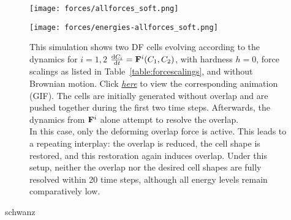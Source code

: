 \begin{figure}[htbp]
	\centering
	\texttt{[image: forces/allforces\_soft.png]}\\[1ex]
	\begin{minipage}[c]{0.35\textwidth}
		\texttt{[image: forces/energies-allforces\_soft.png]}
	\end{minipage}\hfill
	\begin{minipage}[c]{0.6\textwidth}
		\caption{
			This simulation shows two DF cells evolving according to the dynamics for $i=1,2$ $\frac{\mathrm{d} C_i}{\mathrm{d} t} = \mathbf{F}^i(C_1, C_2)$, with hardness $h=0$, force scalings as listed in Table~\ref{table:forcescalings}, and without Brownian motion.
			Click \href{https://github.com/tivo476c/FlexibleCellModel/blob/master/figures/gifs/showForces/show-allForces-soft.gif}{\textit{here}} to view the corresponding animation (GIF).
			The cells are initially generated without overlap and are pushed together during the first two time steps. Afterwards, the dynamics from $\mathbf{F}^i$ alone attempt to resolve the overlap.\\
			In this case, only the deforming overlap force is active. This leads to a repeating interplay: the overlap is reduced, the cell shape is restored, and this restoration again induces overlap.
			Under this setup, neither the overlap nor the desired cell shapes are fully resolved within 20 time steps, although all energy levels remain comparatively low.
		}
		\label{fig:allForces-soft}
	\end{minipage}
\end{figure}


schwanz